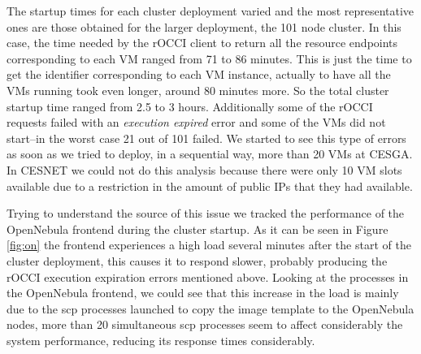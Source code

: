 
The startup times for each cluster deployment varied and the most representative ones are those obtained for the larger deployment, the 101 node cluster. In this case, the time needed by the rOCCI client to return all the resource endpoints corresponding to each VM ranged from 71 to 86 minutes. This is just the time to get the identifier corresponding to each VM instance, actually to have all the VMs running took even longer, around 80 minutes more. So the total cluster startup time ranged from 2.5 to 3 hours. Additionally some of the rOCCI requests failed with an \emph{execution expired} error and some of the VMs did not start--in the worst case 21 out of 101 failed.
We started to see this type of errors as soon as we tried to deploy, in a sequential way, more than 20 VMs at CESGA. In CESNET we could not do this analysis because there were only 10 VM slots available due to a restriction in the amount of public IPs that they had available.

Trying to understand the source of this issue we tracked the performance of the OpenNebula frontend during the cluster startup. As it can be seen in Figure \ref{fig:on} the frontend experiences a high load several minutes after the start of the cluster deployment, this causes it to respond slower, probably producing the rOCCI execution expiration errors mentioned above. Looking at the processes in the OpenNebula frontend, we could see that this increase in the load is mainly due to the scp processes launched to copy the image template to the OpenNebula nodes, more than 20 simultaneous scp processes seem to affect considerably the system performance, reducing its response times considerably.

%
%
%
%

